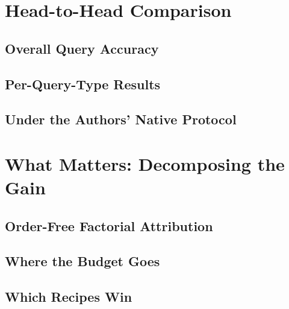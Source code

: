 \documentclass[conference]{IEEEtran}
\begin{document}
\section{Head-to-Head Comparison}
\label{sec:head-to-head}

\subsection{Overall Query Accuracy}
\label{sec:overall}

\subsection{Per-Query-Type Results}
\label{sec:per-query}

\subsection{Under the Authors' Native Protocol}
\label{sec:native}

\section{What Matters: Decomposing the Gain}
\label{sec:what-matters}

\subsection{Order-Free Factorial Attribution}
\label{sec:attribution}

\subsection{Where the Budget Goes}
\label{sec:budget-distribution}

\subsection{Which Recipes Win}
\label{sec:recipes}

\end{document}
